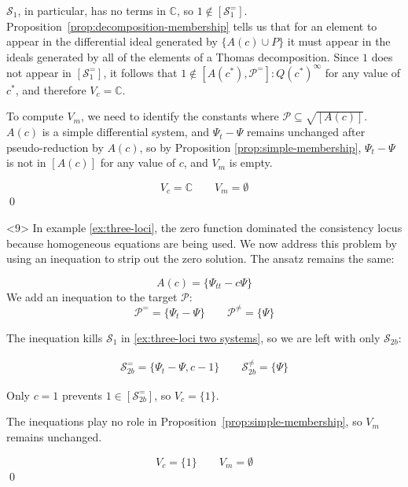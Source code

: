 \documentclass{article}
\theoremstyle{definition}
\theoremstyle{plain}
\begin{document}
\begin{example}
$\mathcal{S}_1$, in particular, has no terms in $\mathbb{C}$, so $1 \notin [\mathcal{S}_1^=]$.
Proposition~\ref{prop:decomposition-membership} tells us that for an element to appear
in the differential ideal generated by $\{A(c) \cup P\}$ it must appear in the
ideals generated by all of the elements of a Thomas decomposition.  Since $1$
does not appear in $[\mathcal{S}_1^=]$, it follows that $1 \notin [A(c^*), \mathcal{P}^=] : Q(c^*)^\infty$
for any value of $c^*$, and therefore $V_c = \mathbb{C}$.

To compute $V_m$, we need to identify the constants where
$\mathcal{P} \subseteq \sqrt{[A(c)]}$.  $A(c)$ is a simple differential
system, and $\Psi_t-\Psi$ remains unchanged after pseudo-reduction by $A(c)$,
so by Proposition \ref{prop:simple-membership}, $\Psi_t-\Psi$ is not in $[A(c)]$
for any value of $c$, and $V_m$ is empty.

\begin{equation*}
V_c  = \mathbb{C} \qquad
V_m = \emptyset
\end{equation*}
\qed
\end{example}

\begin{example}<9>
\label{ex:three-loci-2}
In example \ref{ex:three-loci}, the zero function dominated
the consistency locus because homogeneous equations are being used.
We now address this problem by using an inequation
to strip out the zero solution.  The ansatz remains the same:

\begin{equation}
A(c) = \{ \Psi_{tt} - c \Psi \}
\end{equation}
We add an inequation to the target $\mathcal{P}$:
\begin{equation}
\mathcal{P}^= = \{ \Psi_t - \Psi \} \qquad \mathcal{P}^{\ne} = \{\Psi\}
\end{equation}

The inequation kills $\mathcal{S}_1$ in \eqref{ex:three-loci two systems}, so we are left with only $\mathcal{S}_{2b}$:

\begin{equation}
\begin{gathered}
\mathcal{S}_{2b}^= = \{ \Psi_t - \Psi,  c - 1 \} \qquad \mathcal{S}_{2b}^{\ne} = \{ \Psi \}
\end{gathered}
\end{equation}

Only $c=1$ prevents $1 \in [\mathcal{S}_{2b}^=]$, so $V_c = \{1\}$.

The inequations play no role in Proposition~\ref{prop:simple-membership}, so $V_m$ remains unchanged.

\begin{equation*}
V_c  = \{ 1 \} \qquad
V_m = \emptyset
\end{equation*}
\qed
\end{example}
\end{document}

